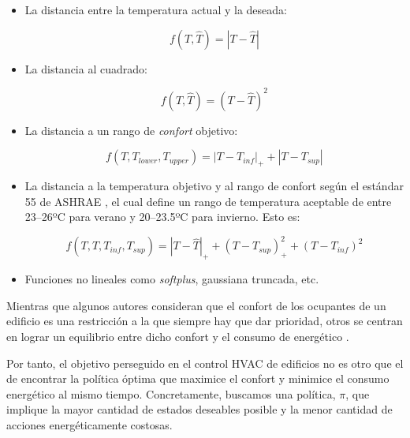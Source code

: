  \begin{itemize}
    \item La distancia entre la temperatura actual y la deseada: 
    
        \begin{equation}
            f(T, \hat{T}) = |T - \hat{T}|
        \end{equation}
        
    \item La distancia al cuadrado:
    
        \begin{equation}
            f(T, \hat{T}) = (T - \hat{T})^2
        \end{equation}
    
    \item La distancia a un rango de \textit{confort} objetivo:
    
        \begin{equation}
            f(T, T_{lower}, T_{upper}) = |T - T_{inf}|_+ + |T - T_{sup}|
        \end{equation}
    
    \item La distancia a la temperatura objetivo y al rango de confort según el estándar 55 de ASHRAE \cite{ansi2004standard}, el cual define un rango de temperatura aceptable de entre 23--26ºC para verano y 20--23.5ºC para invierno. Esto es:
    
        \begin{equation}
            f(T, \hat{T}, T_{inf}, T_{sup}) = |T - \hat{T}|_+ + (T - T_{sup})_+^2 + (T - T_{inf})^2
        \end{equation}
    
    \item Funciones no lineales como \textit{softplus}, gaussiana truncada, etc.
\end{itemize}

Mientras que algunos autores consideran que el confort de los ocupantes de un edificio es una restricción a la que siempre hay que dar prioridad, otros se centran en lograr un equilibrio entre dicho confort y el consumo de energético \cite{vazquez2019reinforcement}. 

Por tanto, el objetivo perseguido en el control HVAC de edificios no es otro que el de encontrar la política óptima que maximice el confort y minimice el consumo energético al mismo tiempo. Concretamente, buscamos una política, $\pi$, que implique la mayor cantidad de estados deseables posible y la menor cantidad de acciones energéticamente costosas.

